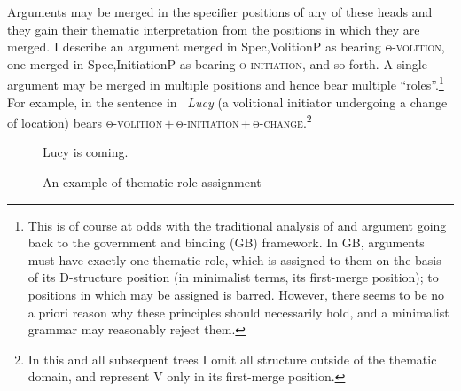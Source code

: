 \documentclass[output=paper]{langsci/langscibook}
\begin{document}
Arguments may be merged in the specifier positions of any of these heads and
they gain their thematic interpretation from the positions in which they are
merged. I describe an argument merged in Spec,VolitionP as bearing
\textsc{θ-volition}, one merged  in Spec,InitiationP as bearing
\textsc{θ-initiation}, and so forth. A single argument may be merged in
multiple positions and hence bear multiple \enquote{roles}.\footnote{This is of
    course at odds with the traditional analysis of  and argument
     going back to the government and binding (\gls{GB}) framework. In \gls{GB},
    arguments must have exactly one thematic role, which is assigned to them on
    the basis of its D-structure position (in minimalist terms, its first-merge
    position);  to positions in which  may be assigned is
barred. However, there seems to be no a priori reason why these
principles should necessarily hold, and a minimalist grammar may reasonably
reject them.} For example, in the sentence in~
\emph{Lucy} (a volitional initiator undergoing a change of location) bears
\textsc{θ-volition\,$+$\,θ-initiation\,$+$\,θ-change}.\footnote{In this and all
    subsequent trees I omit all structure outside of the thematic domain, and
represent V only in its first-merge position.}

\begin{figure}
\caption{An example of thematic role assignment\label{fig:baker:2lucy}}
\raggedright Lucy is coming.\\
\end{figure}
\end{document}
